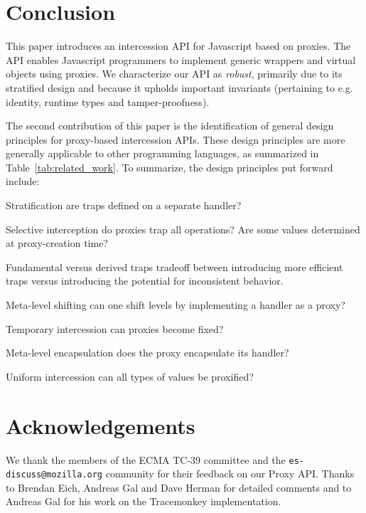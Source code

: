 \documentclass{sig-alternate}
\begin{document}

\section{Conclusion}

This paper introduces an intercession API for Javascript based on proxies. The API enables Javascript programmers to implement generic wrappers and virtual objects using proxies. We characterize our API as \emph{robust}, primarily due to its stratified design and because it upholds important invariants (pertaining to e.g. identity, runtime types and tamper-proofness).

The second contribution of this paper is the identification of general design principles for proxy-based intercession APIs. These design principles are more generally applicable to other programming languages, as summarized in Table~\ref{tab:related_work}. To summarize, the design principles put forward include:

\begin{description*}
  \item[Stratification] are traps defined on a separate handler?
  \item[Selective interception] do proxies trap all operations? Are some values determined at proxy-creation time?
  \item[Fundamental versus derived traps] tradeoff between introducing more efficient traps versus introducing the potential for inconsistent behavior.
  \item[Meta-level shifting] can one shift levels by implementing a handler as a proxy?
  \item[Temporary intercession] can proxies become fixed?
  \item[Meta-level encapsulation] does the proxy encapsulate its handler?
  \item[Uniform intercession] can all types of values be proxified?
\end{description*}

\section*{Acknowledgements}

We thank the members of the ECMA TC-39 committee and the \texttt{es-discuss@mozilla.org} community for their feedback on our Proxy API. Thanks to Brendan Eich, Andreas Gal and Dave Herman for detailed comments and to Andreas Gal for his work on the Tracemonkey implementation.



\end{document}
